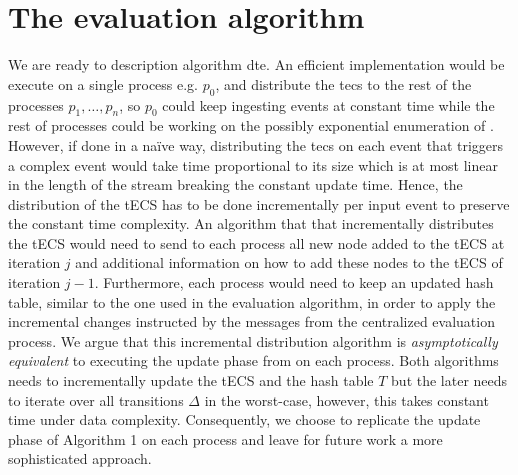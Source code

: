 \section{The evaluation algorithm}\label{sec:evaluation}

We are ready to description algorithm \acrshort{dte}. An efficient implementation would be execute \cite[Algorithm 1]{core} on a single process e.g. $p_{0}$, and distribute the \acrshort{tecs} \tecs to the rest of the processes $p_{1}, \ldots, p_{n}$, so $p_{0}$ could keep ingesting events at constant time while the rest of processes could be working on the possibly exponential enumeration of \tecs. However, if done in a na\"ive way, distributing the \acrshort{tecs} on each event that triggers a complex event would take time proportional to its size which is at most linear in the length of the stream breaking the constant update time. Hence, the distribution of the tECS has to be done incrementally per input event to preserve the constant time complexity. An algorithm that that incrementally distributes the tECS would need to send to each process all new node added to the tECS at iteration $j$ and additional information on how to add these nodes to the tECS of iteration $j-1$. Furthermore, each process would need to keep an updated hash table, similar to the one used in the evaluation algorithm, in order to apply the incremental changes instructed by the messages from the centralized evaluation process. We argue that this incremental distribution algorithm is \emph{asymptotically equivalent} to executing the update phase from \cite[Algorithm 1]{core} on each process. Both algorithms needs to incrementally update the tECS and the hash table $T$ but the later needs to iterate over all transitions $\Delta$ in the worst-case, however, this takes constant time under data complexity. Consequently, we choose to replicate the update phase of Algorithm 1 on each process and leave for future work a more sophisticated approach.

